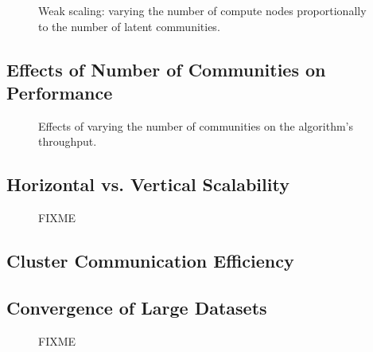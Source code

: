 \begin{figure}[t] %
  \centering
  \caption{Weak scaling: varying the number of compute nodes proportionally to
  the number of latent communities.}
  \label{fig-weak-scaling}
\end{figure}

\subsection{Effects of Number of Communities on Performance}
\begin{figure}[t] %
  \centering
  \caption{Effects of varying the number of communities on the algorithm's
  throughput.}
  \label{fig-throughput}
\end{figure}

\subsection{Horizontal vs. Vertical Scalability}
\begin{figure}[t] %
  \centering
  \caption{FIXME}
  \label{fig-ppx-cpu}
\end{figure}

\subsection{Cluster Communication Efficiency}

\subsection{Convergence of Large Datasets}
\begin{figure*}[t] %
  \centering
  \caption{FIXME}
  \label{fig-ppx-cpu}
\end{figure*}

